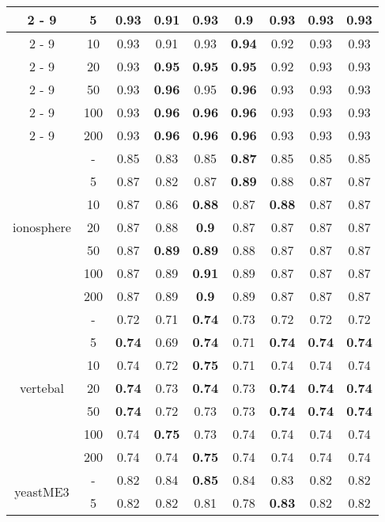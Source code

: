\documentclass{article}%
\begin{document}
\begin{longtable}{c|c|ccccccc}
\cline{2%
-%
9}%
&5&\textbf{0.93}&0.91&\textbf{0.93}&0.9&\textbf{0.93}&\textbf{0.93}&\textbf{0.93}\\%
\cline{2%
-%
9}%
&10&0.93&0.91&0.93&\textbf{0.94}&0.92&0.93&0.93\\%
\cline{2%
-%
9}%
&20&0.93&\textbf{0.95}&\textbf{0.95}&\textbf{0.95}&0.92&0.93&0.93\\%
\cline{2%
-%
9}%
&50&0.93&\textbf{0.96}&0.95&\textbf{0.96}&0.93&0.93&0.93\\%
\cline{2%
-%
9}%
&100&0.93&\textbf{0.96}&\textbf{0.96}&\textbf{0.96}&0.93&0.93&0.93\\%
\cline{2%
-%
9}%
&200&0.93&\textbf{0.96}&\textbf{0.96}&\textbf{0.96}&0.93&0.93&0.93\\%
\hline%
\multirow{7}{*}{ionosphere}&{-}&0.85&0.83&0.85&\textbf{0.87}&0.85&0.85&0.85\\%
\cline{2%
-%
9}%
&5&0.87&0.82&0.87&\textbf{0.89}&0.88&0.87&0.87\\%
\cline{2%
-%
9}%
&10&0.87&0.86&\textbf{0.88}&0.87&\textbf{0.88}&0.87&0.87\\%
\cline{2%
-%
9}%
&20&0.87&0.88&\textbf{0.9}&0.87&0.87&0.87&0.87\\%
\cline{2%
-%
9}%
&50&0.87&\textbf{0.89}&\textbf{0.89}&0.88&0.87&0.87&0.87\\%
\cline{2%
-%
9}%
&100&0.87&0.89&\textbf{0.91}&0.89&0.87&0.87&0.87\\%
\cline{2%
-%
9}%
&200&0.87&0.89&\textbf{0.9}&0.89&0.87&0.87&0.87\\%
\hline%
\multirow{7}{*}{vertebal}&{-}&0.72&0.71&\textbf{0.74}&0.73&0.72&0.72&0.72\\%
\cline{2%
-%
9}%
&5&\textbf{0.74}&0.69&\textbf{0.74}&0.71&\textbf{0.74}&\textbf{0.74}&\textbf{0.74}\\%
\cline{2%
-%
9}%
&10&0.74&0.72&\textbf{0.75}&0.71&0.74&0.74&0.74\\%
\cline{2%
-%
9}%
&20&\textbf{0.74}&0.73&\textbf{0.74}&0.73&\textbf{0.74}&\textbf{0.74}&\textbf{0.74}\\%
\cline{2%
-%
9}%
&50&\textbf{0.74}&0.72&0.73&0.73&\textbf{0.74}&\textbf{0.74}&\textbf{0.74}\\%
\cline{2%
-%
9}%
&100&0.74&\textbf{0.75}&0.73&0.74&0.74&0.74&0.74\\%
\cline{2%
-%
9}%
&200&0.74&0.74&\textbf{0.75}&0.74&0.74&0.74&0.74\\%
\hline%
\multirow{7}{*}{yeastME3}&{-}&0.82&0.84&\textbf{0.85}&0.84&0.83&0.82&0.82\\%
\cline{2%
-%
9}%
&5&0.82&0.82&0.81&0.78&\textbf{0.83}&0.82&0.82\\%

\end{longtable}
\end{document}
